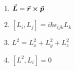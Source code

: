 

\vspace*{\fill}
\centering

\begin{enumerate}
    \item $\va*{L} = \va*{r} \cross \va*{p}$ 
    \item $[L_{i},L_{j}] = i \hbar\epsilon_{ijk} L_{k}$
    \item $L^2 = L_{x}^2 + L_{y}^2 + L_{z}^2$ 
    \item $[L^2,L_{i}] = 0$
\end{enumerate}

\centering
\vspace*{\fill}

